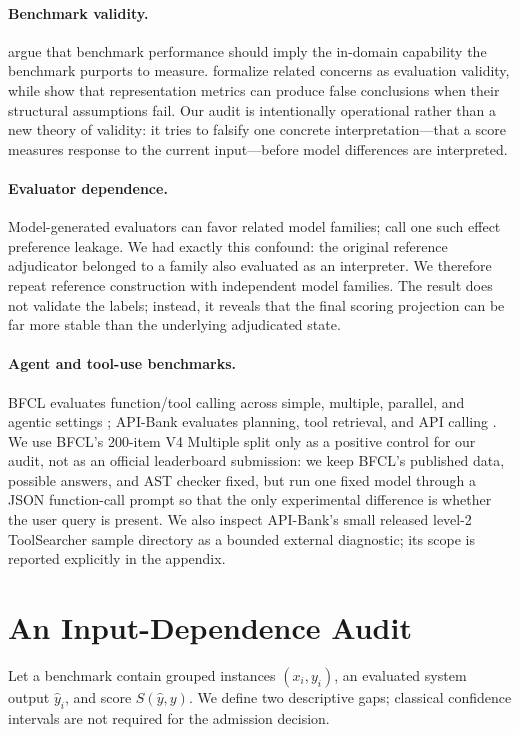 \documentclass{article}
\begin{document}
\paragraph{Benchmark validity.}
\citet{bowman2021benchmarking} argue that benchmark performance should imply the in-domain capability the benchmark purports to measure. \citet{thomas2026validity} formalize related concerns as evaluation validity, while \citet{joshi2026guardians} show that representation metrics can produce false conclusions when their structural assumptions fail. Our audit is intentionally operational rather than a new theory of validity: it tries to falsify one concrete interpretation---that a score measures response to the current input---before model differences are interpreted.

\paragraph{Evaluator dependence.}
Model-generated evaluators can favor related model families; \citet{li2026preference} call one such effect preference leakage. We had exactly this confound: the original reference adjudicator belonged to a family also evaluated as an interpreter. We therefore repeat reference construction with independent model families. The result does not validate the labels; instead, it reveals that the final scoring projection can be far more stable than the underlying adjudicated state.

\paragraph{Agent and tool-use benchmarks.}
BFCL evaluates function/tool calling across simple, multiple, parallel, and agentic settings \citep{patil2025bfcl}; API-Bank evaluates planning, tool retrieval, and API calling \citep{li2023apibank}. We use BFCL's 200-item V4 Multiple split only as a positive control for our audit, not as an official leaderboard submission: we keep BFCL's published data, possible answers, and AST checker fixed, but run one fixed model through a JSON function-call prompt so that the only experimental difference is whether the user query is present. We also inspect API-Bank's small released level-2 ToolSearcher sample directory as a bounded external diagnostic; its scope is reported explicitly in the appendix.

\section{An Input-Dependence Audit}
Let a benchmark contain grouped instances $(x_i,y_i)$, an evaluated system output $\hat y_i$, and score $S(\hat y,y)$. We define two descriptive gaps; classical confidence intervals are not required for the admission decision.
\end{document}
